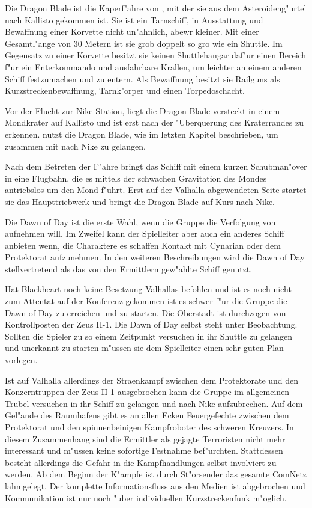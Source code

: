
Die Dragon Blade ist die Kaperf"ahre von \xl{}, mit der sie aus dem Asteroideng"urtel nach Kallisto gekommen ist. Sie ist ein Tarnschiff, in Ausstattung und Bewaffnung einer Korvette nicht un"ahnlich, abewr kleiner. Mit einer Gesamtl"ange von 30 Metern ist sie grob doppelt so gro\3 wie ein Shuttle. Im Gegensatz zu einer Korvette besitzt sie keinen Shuttlehangar daf"ur einen Bereich f"ur ein Enterkommando und ausfahrbare Krallen, um leichter an einem anderen Schiff festzumachen und zu entern. Als Bewaffnung besitzt sie Railguns als Kurzstreckenbewaffnung, Tarnk"orper und einen Torpedoschacht. 

Vor der Flucht zur Nike Station, liegt die Dragon Blade versteckt in einem Mondkrater auf Kallisto und ist erst nach der "Uberquerung des Kraterrandes zu erkennen. \xl{} nutzt die Dragon Blade, wie im letzten Kapitel beschrieben, um zusammen mit \ml{} nach Nike zu gelangen. 

Nach dem Betreten der F"ahre bringt \xl{} das Schiff mit einem kurzen Schubman"over in eine Flugbahn, die es mittels der schwachen Gravitation des Mondes antriebslos um den Mond f"uhrt. Erst auf der Valhalla abgewendeten Seite startet sie das Haupttriebwerk und bringt die Dragon Blade auf Kurs nach Nike. 

Die Dawn of Day ist die erste Wahl, wenn die Gruppe die Verfolgung von \xl{} aufnehmen will. Im Zweifel kann der Spielleiter aber auch ein anderes Schiff anbieten wenn, die Charaktere es schaffen Kontakt mit Cynarian oder dem Protektorat aufzunehmen. In den weiteren Beschreibungen wird die Dawn of Day stellvertretend als das von den Ermittlern gew"ahlte Schiff genutzt.

Hat Blackheart noch keine Besetzung Valhallas befohlen und ist es noch nicht zum Attentat auf der Konferenz gekommen ist es schwer f"ur die Gruppe die Dawn of Day zu erreichen und zu starten. Die Oberstadt ist durchzogen von Kontrollposten der Zeus II-1. Die Dawn of Day selbst steht unter Beobachtung. Sollten die Spieler zu so einem Zeitpunkt versuchen in ihr Shuttle zu gelangen und unerkannt zu starten m"ussen sie dem Spielleiter einen sehr guten Plan vorlegen.

Ist auf Valhalla allerdings der Stra\3enkampf zwischen dem Protektorate und den Konzerntruppen der Zeus II-1 ausgebrochen kann die Gruppe im allgemeinen Trubel versuchen in ihr Schiff zu gelangen und nach Nike aufzubrechen. Auf dem Gel"ande des Raumhafens gibt es an allen Ecken Feuergefechte zwischen dem Protektorat und den spinnenbeinigen Kampfroboter des schweren Kreuzers. In diesem Zusammenhang sind die Ermittler als gejagte Terroristen nicht mehr interessant und  m"ussen keine sofortige Festnahme bef"urchten. Stattdessen besteht allerdings die Gefahr in die Kampfhandlungen selbst involviert zu werden. Ab dem Beginn der K"ampfe ist durch St"orsender das gesamte ComNetz lahmgelegt. Der komplette Informationsfluss aus den Medien ist abgebrochen und Kommunikation ist nur noch "uber individuellen Kurzstreckenfunk m"oglich.

